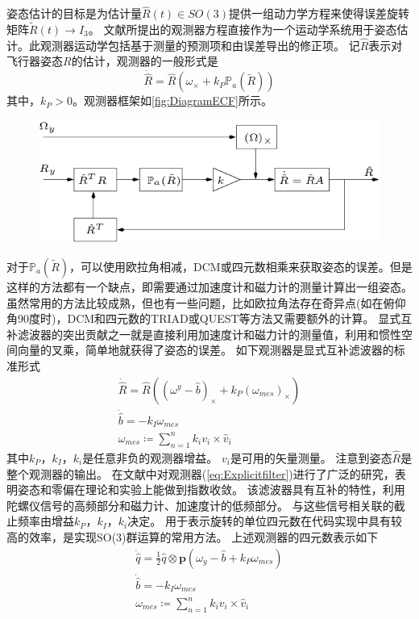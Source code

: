 \documentclass[
  type=master
]{gdutthesis}
\begin{document}
姿态估计的目标是为估计量$\hat{R}(t)\in SO(3)$提供一组动力学方程来使得误差旋转矩阵$\widetilde{R}(t)\rightarrow I_3$。
文献\parencite{mahony2008nonlinear}所提出的观测器方程直接作为一个运动学系统用于姿态估计。此观测器运动学包括基于测量的预测项和由误差导出的修正项。
记$\hat{R}$表示对飞行器姿态$R$的估计，观测器的一般形式是
\begin{equation}\label{eq:passivefilter}
	\dot{\hat{R}}=\hat{R}(\omega_{\times}+k_P \mathbb{P}_a(\widetilde{R}))
\end{equation}
其中，$k_P>0$。观测器框架如\autoref{fig:DiagramECF}所示。
\begin{figure}[htbp]
	\centering
	\includegraphics[width=1.0\textwidth]{Block-diagram-of-the-simplified-form-of-the-passive-complementary-filter.png}
	\label{fig:DiagramECF}
\end{figure}
对于$\mathbb{P}_a(\widetilde{R})$，可以使用欧拉角相减，DCM或四元数相乘来获取姿态的误差。但是这样的方法都有一个缺点，即需要通过加速度计和磁力计的测量计算出一组姿态。
虽然常用的方法比较成熟，但也有一些问题，比如欧拉角法存在奇异点(如在俯仰角90度时)，DCM和四元数的TRIAD或QUEST等方法又需要额外的计算。
显式互补滤波器的突出贡献之一就是直接利用加速度计和磁力计的测量值，利用和惯性空间向量的叉乘，简单地就获得了姿态的误差。
如下观测器是\vspace{1ex}显式互补滤波器的标准形式
\begin{gather}\label{eq:Explicitfilter}
		\dot{\hat{R}} =\hat{R}((\omega^y - \hat{b})_{\times}+k_P (\omega_{mes})_{\times})\\
		\dot{\hat{b}} =-k_I \omega_{mes}\\
		\omega_{mes} \coloneqq \sum_{n=1}^{n} k_i v_i \times \hat{v}_i	
\end{gather}
其中$k_P$，$k_I$，$k_i$是任意非负的观测器增益。
$v_i$是可用的矢量测量。
注意到姿态$\hat{R}$是整个观测器的输出。
在文献\parencite{mahony2008nonlinear}中对观测器(\autoref{eq:Explicitfilter})进行了广泛的研究，表明姿态和零偏在理论和实验上能做到指数收敛。
该滤波器具有互补的特性，利用陀螺仪信号的高频部分和磁力计、加速度计的低频部分\cite{mahony2008nonlinear}。
与这些信号相关联的截止频率由增益$k_P$，$k_I$，$k_i$决定。
用于表示旋转的单位四元数在代码实现中具有较高的效率，是实现SO(3)\vspace{1ex}群运算的常用方法。
上述观测器的四元数表示如下
\begin{gather}\label{eq:quatfilter}
		\dot{\hat{q}}=\frac{1}{2} \hat{q} \otimes \mathbf{p}(\omega_y - \hat{b} + k_P \omega_{mes})\\
		\dot{\hat{b}}=-k_I \omega_{mes}\\
		\omega_{mes} \coloneqq \sum_{n=1}^{n} k_i v_i \times \hat{v}_i	
\end{gather}
\end{document}
